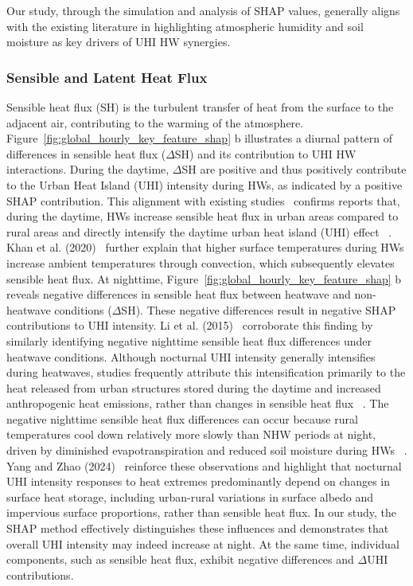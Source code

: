 Our study, through the simulation and analysis of SHAP values, generally aligns with the existing literature in highlighting atmospheric humidity and soil moisture as key drivers of UHI HW synergies. 





\subsubsection*{Sensible and Latent Heat Flux}Sensible heat flux (SH) is the turbulent transfer of heat from the surface to the adjacent air, contributing to the warming of the atmosphere. Figure~\ref{fig:global_hourly_key_feature_shap} b illustrates a diurnal pattern of differences in sensible heat flux (\ensuremath{\Delta }SH) and its contribution to UHI HW interactions. \mbox{}\protect\newline During the daytime, \ensuremath{\Delta }SH are positive and thus positively contribute to the Urban Heat Island (UHI) intensity during HWs, as indicated by a positive SHAP contribution. This alignment with existing studies\unskip~\cite{2755510:33598941,2755510:33598935}  confirms reports that, during the daytime, HWs increase sensible heat flux in urban areas compared to rural areas and directly intensify the daytime urban heat island (UHI) effect\unskip~\cite{2755510:33598935} . Khan et al. (2020)\unskip~\cite{2755510:33598943}  further explain that higher surface temperatures during HWs increase ambient temperatures through convection, which subsequently elevates sensible heat flux. \mbox{}\protect\newline At nighttime, Figure~\ref{fig:global_hourly_key_feature_shap} b reveals negative differences in sensible heat flux between heatwave and non-heatwave conditions (\ensuremath{\Delta }SH). These negative differences result in negative SHAP contributions to UHI intensity. Li et al. (2015)\unskip~\cite{2755510:33598935}  corroborate this finding by similarly identifying negative nighttime sensible heat flux differences under heatwave conditions. Although nocturnal UHI intensity generally intensifies during heatwaves, studies frequently attribute this intensification primarily to the heat released from urban structures stored during the daytime and increased anthropogenic heat emissions, rather than changes in sensible heat flux\unskip~\cite{2755510:33598928} . The negative nighttime sensible heat flux differences can occur because rural temperatures cool down relatively more slowly than NHW periods at night, driven by diminished evapotranspiration and reduced soil moisture during HWs\unskip~\cite{2755510:33598893} . Yang and Zhao (2024)\unskip~\cite{2755510:33598892}  reinforce these observations and highlight that nocturnal UHI intensity responses to heat extremes predominantly depend on changes in surface heat storage, including urban-rural variations in surface albedo and impervious surface proportions, rather than sensible heat flux. In our study, the SHAP method effectively distinguishes these influences and demonstrates that overall UHI intensity may indeed increase at night. At the same time, individual components, such as sensible heat flux, exhibit negative differences and  \ensuremath{\Delta }UHI contributions.

